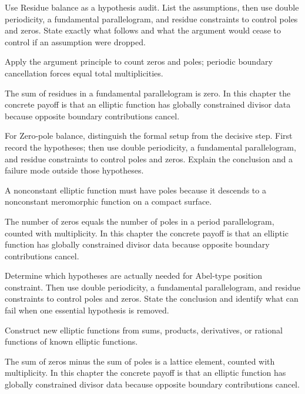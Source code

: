 \begin{exercise}\label{exr:iv28-04}
Use Residue balance as a hypothesis audit. List the assumptions, then use double periodicity, a fundamental parallelogram, and residue constraints to control poles and zeros. State exactly what follows and what the argument would cease to control if an assumption were dropped.
\end{exercise}
\begin{hint}
Apply the argument principle to count zeros and poles; periodic boundary cancellation forces equal total multiplicities.
\end{hint}
\begin{solution}
The sum of residues in a fundamental parallelogram is zero. In this chapter the concrete payoff is that an elliptic function has globally constrained divisor data because opposite boundary contributions cancel.
\end{solution}

\begin{exercise}\label{exr:iv28-05}
For Zero-pole balance, distinguish the formal setup from the decisive step. First record the hypotheses; then use double periodicity, a fundamental parallelogram, and residue constraints to control poles and zeros. Explain the conclusion and a failure mode outside those hypotheses.
\end{exercise}
\begin{hint}
A nonconstant elliptic function must have poles because it descends to a nonconstant meromorphic function on a compact surface.
\end{hint}
\begin{solution}
The number of zeros equals the number of poles in a period parallelogram, counted with multiplicity. In this chapter the concrete payoff is that an elliptic function has globally constrained divisor data because opposite boundary contributions cancel.
\end{solution}

\begin{exercise}\label{exr:iv28-06}
Determine which hypotheses are actually needed for Abel-type position constraint. Then use double periodicity, a fundamental parallelogram, and residue constraints to control poles and zeros. State the conclusion and identify what can fail when one essential hypothesis is removed.
\end{exercise}
\begin{hint}
Construct new elliptic functions from sums, products, derivatives, or rational functions of known elliptic functions.
\end{hint}
\begin{solution}
The sum of zeros minus the sum of poles is a lattice element, counted with multiplicity. In this chapter the concrete payoff is that an elliptic function has globally constrained divisor data because opposite boundary contributions cancel.
\end{solution}

